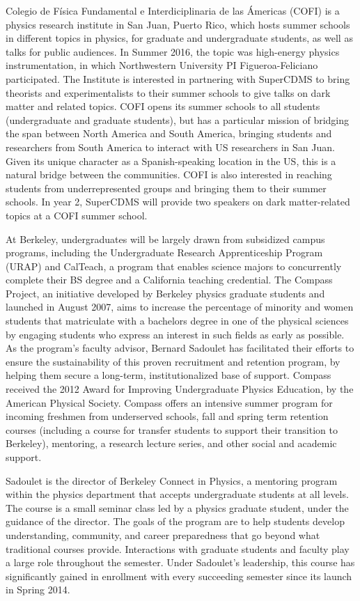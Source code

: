 Colegio de Física Fundamental e Interdiciplinaria de las Ámericas (COFI) is a physics research institute in San Juan, Puerto Rico, which hosts summer schools in different topics in physics, for graduate and undergraduate students, as well as talks for public audiences. In Summer 2016, the topic was high-energy physics instrumentation, in which Northwestern University PI Figueroa-Feliciano participated. The Institute is interested in partnering with SuperCDMS to bring theorists and experimentalists to their summer schools to give talks on dark matter and related topics. COFI opens its summer schools to all students (undergraduate and graduate students), but has a particular mission of bridging the span between North America and South America, bringing students and researchers from South America to interact with US researchers in San Juan. Given its unique character as a Spanish-speaking location in the US, this is a natural bridge between the communities. COFI is also interested in reaching students from underrepresented groups and bringing them to their summer schools.  In year 2, SuperCDMS will provide two speakers on dark matter-related topics at a COFI summer school. 

At Berkeley, undergraduates will be largely drawn from subsidized campus programs, including the Undergraduate Research Apprenticeship Program (URAP) and CalTeach, a program that enables science majors to concurrently complete their BS degree and a California teaching credential. The Compass Project, an initiative developed by Berkeley physics graduate students and launched in August 2007, aims to increase the percentage of minority and women students that matriculate with a bachelors degree in one of the physical sciences by engaging students who express an interest in such fields as early as possible. As the program’s faculty advisor, Bernard Sadoulet has facilitated their efforts to ensure the sustainability of this proven recruitment and retention program, by helping them secure a long-term, institutionalized base of support. Compass received the 2012 Award for Improving Undergraduate Physics Education, by the American Physical Society. Compass offers an intensive summer program for incoming freshmen from underserved schools, fall and spring term retention courses (including a course for transfer students to support their transition to Berkeley), mentoring, a research lecture series, and other social and academic support. %

Sadoulet is the director of Berkeley Connect in Physics, a mentoring program within the physics department that accepts undergraduate students at all levels. The course is a small seminar class led by a physics graduate student, under the guidance of the director. The goals of the program are to help students develop understanding, community, and career preparedness that go beyond what traditional courses provide. Interactions with graduate students and faculty play a large role throughout the semester. Under Sadoulet’s leadership, this course has significantly gained in enrollment with every succeeding semester since its launch in Spring 2014. %

